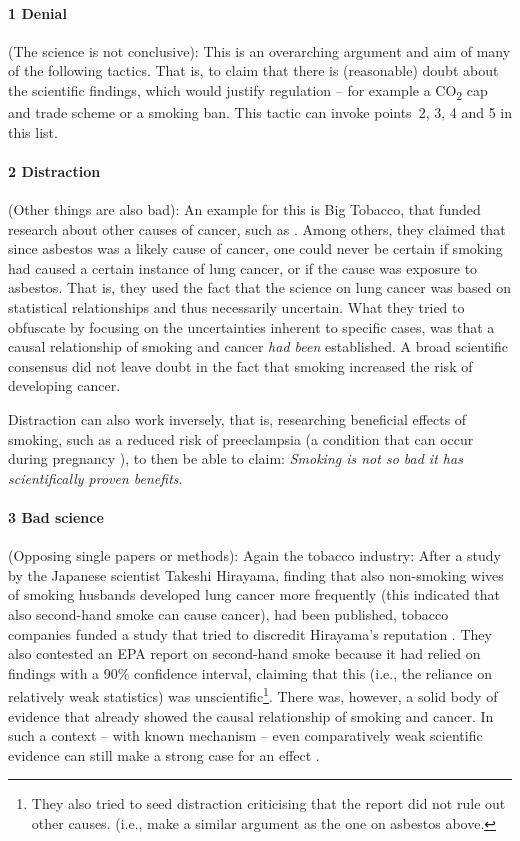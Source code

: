 \paragraph{1 Denial} (The science is not conclusive): This is an overarching argument and aim of many of the following tactics. 
That is, to claim that there is (reasonable) doubt about the scientific findings, which would justify regulation -- for example a CO\textsubscript{2} cap and trade scheme or a smoking ban. 
This tactic can invoke points  \,2, 3, 4 and 5 in this list.

\paragraph{2 Distraction} (Other things are also bad):  An example for this is Big Tobacco, that funded research about other causes of cancer, such as  \citep[p 14]{oreskes_merchants_2010}. 
Among others, they claimed that since asbestos was a likely cause of cancer, one could never be certain if smoking had caused a certain instance of lung cancer, or if the cause was exposure to asbestos. 
That is, they used the fact that the science on lung cancer was based on statistical relationships and thus necessarily uncertain.
What they tried to obfuscate by focusing on the uncertainties inherent to specific cases, was that a causal relationship of smoking and cancer \emph{had been} established.
A broad scientific consensus did not leave doubt in the fact that smoking increased the risk of developing cancer. 

Distraction can also work inversely, that is, researching beneficial effects of smoking, such as a reduced risk of preeclampsia (a condition that can occur during pregnancy \citep{lain_urinary_1999}), to then be able to claim: \textit{Smoking is not so bad it has scientifically proven benefits}.

\paragraph{3 Bad science} (Opposing single papers or methods): Again the tobacco industry: After a study by the Japanese scientist Takeshi Hirayama, finding that also non-smoking wives of smoking husbands developed lung cancer more frequently (this indicated that also second-hand smoke can cause cancer), had been published, tobacco companies funded a study that tried to discredit Hirayama's reputation \citep[p 138]{oreskes_merchants_2010}. 
They also contested an EPA report on second-hand smoke because it had relied on findings with a 90\% confidence interval, claiming that this (i.e., the reliance on relatively weak statistics) was unscientific\footnote{They also tried to seed distraction criticising that the report did not rule out other causes. (i.e., make a similar argument as the one on asbestos above.}. 
There was, however, a solid body of evidence that already showed the causal relationship of smoking and cancer. 
In such a context -- with known mechanism -- even comparatively weak scientific evidence can still make a strong case for an effect \citep[p 141-144, 156-160]{oreskes_merchants_2010}. 

